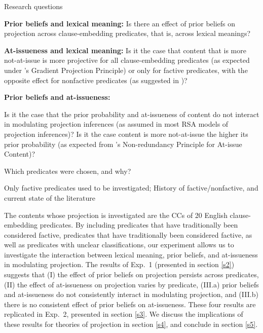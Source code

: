 \documentclass[11pt,fleqn]{article}
\newcommand{\6}{\mbox{$[\hspace*{-.6mm}[$}}
\newcommand{\9}{\mbox{$]\hspace*{-.6mm}]$}}
\newcommand{\citepos}[1]{\citeauthor{#1}'s \citeyear{#1}}
\begin{document}
\begin{exe}
\ex\label{questions} Research questions
\begin{xlist}
 {\bf Prior beliefs and lexical meaning:} Is there an effect of prior beliefs on projection across clause-embedding predicates, that is, across lexical meanings? 

 {\bf At-issueness and lexical meaning:} Is it the case that content that is more not-at-issue is more projective for all clause-embedding predicates (as expected under \citepos{tbd-variability} Gradient Projection Principle) or only for factive predicates, with the opposite effect for nonfactive predicates (as suggested in \citealt{djaerv-bacovcin-salt27,djaerv-bacovcin2020})?

 {\bf Prior beliefs and at-issueness:} 
\begin{xlist}
 Is it the case that the prior probability and at-issueness of content do not interact in modulating projection inferences  (as assumed in most RSA models of projection inferences)? 
 Is it the case content is more not-at-issue the higher its prior probability (as expected from \citepos{tonhauser-etal-eval} Non-redundancy Principle for At-issue Content)? 
\end{xlist}
\end{xlist}
\end{exe}

Which predicates were chosen, and why?

Only factive predicates used to be investigated;
History of factive/nonfactive, and current state of the literature

\citealt{kiparsky-kiparsky70}

\citealt{demarneffe-etal-sub23}
\citealt{tbd-variability}
\citealt{degen-tonhauser-language}



The contents whose projection is investigated are the CCs of 20 English clause-embedding predicates. By including predicates that have traditionally been considered factive, predicates that have traditionally been considered factive, as well as predicates with unclear classifications, our experiment allows us to investigate the interaction between lexical meaning, prior beliefs, and at-issueness in modulating projection.  The results of Exp.~1 (presented in section \ref{s2}) suggests that (I) the effect of prior beliefs on projection persists across predicates, (II) the effect of at-issueness on projection varies by predicate, (III.a) prior beliefs and at-issueness do not consistently interact in modulating projection, and (III.b) there is no consistent effect of prior beliefs on at-issueness. These four results are replicated in Exp.~2, presented in section \ref{s3}. We discuss the implications of these results for theories of projection in section \ref{s4}, and conclude in section \ref{s5}.
\end{document}
